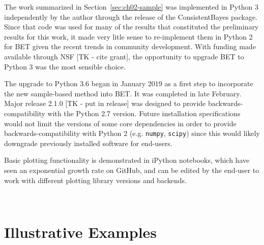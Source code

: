 The work summarized in Section~\ref{sec:ch02-sample} was implemented in Python 3 independently by the author through the release of the ConsistentBayes package.
Since that code was used for many of the results that constituted the preliminary results for this work, it made very litle sense to re-implement them in Python 2 for BET given the recent trends in community development. 
With funding made available through NSF [TK - cite grant], the opportunity to upgrade BET to Python 3 was the most sensible choice. 

The upgrade to Python 3.6 began in January 2019 as a first step to incorporate the new sample-based method into BET. 
It was completed in late February. 
Major release 2.1.0 [TK - put in release] was designed to provide backwards-compatibility with the Python 2.7 version. 
Future installation specifications would not limit the versions of some core dependencies in order to provide backwards-compatibility with Python 2 (e.g. {\tt numpy}, {\tt scipy}) since this would likely downgrade previously installed software for end-users. 

Basic plotting functionality is demonstrated in iPython notebooks, which have seen an exponential growth rate on GitHub, and can be edited by the end-user to work with different plotting library versions and backends.




\
\section{Illustrative Examples}


